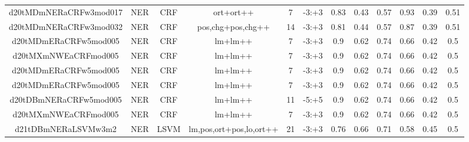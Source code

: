 \documentclass[a4paper]{article}
\begin{document}
\begin{landscape}
\begin{center}
\begin{tabular}{ |c|c|c|c|c|c|c|c|c|c|c|c|}
 	
 
 	
 		
 		\small{ d20tMDmNERaCRFw3mod017 } & NER & CRF & ort+ort++  &  7 &  -3:+3  &  0.83 & 0.43 & 0.57  &  0.93 & 0.39 & 0.51 \\
 		

 	
 
 	
 		
 		\small{ d20tMDmNERaCRFw3mod032 } & NER & CRF & pos,chg+pos,chg++  &  14 &  -3:+3  &  0.81 & 0.44 & 0.57  &  0.87 & 0.39 & 0.51 \\
 		

 	
 
 	
 		
 		\small{ d20tMDmERaCRFw5mod005 } & NER & CRF & lm+lm++  &  7 &  -3:+3  &  0.9 & 0.62 & 0.74  &  0.66 & 0.42 & 0.5 \\
 		

 	
 
 	
 		
 		\small{ d20tMXmNWEaCRFmod005 } & NER & CRF & lm+lm++  &  7 &  -3:+3  &  0.9 & 0.62 & 0.74  &  0.66 & 0.42 & 0.5 \\
 		

 	
 
 	
 		
 		\small{ d20tMDmERaCRFw5mod005 } & NER & CRF & lm+lm++  &  7 &  -3:+3  &  0.9 & 0.62 & 0.74  &  0.66 & 0.42 & 0.5 \\
 		

 	
 
 	
 		
 		\small{ d20tMDmERaCRFw5mod005 } & NER & CRF & lm+lm++  &  7 &  -3:+3  &  0.9 & 0.62 & 0.74  &  0.66 & 0.42 & 0.5 \\
 		

 	
 
 	
 		
 		\small{ d20tDBmNERaCRFw5mod005 } & NER & CRF & lm+lm++  &  11 &  -5:+5  &  0.9 & 0.62 & 0.74  &  0.66 & 0.42 & 0.5 \\
 		

 	
 
 	
 		
 		\small{ d20tMXmNWEaCRFmod005 } & NER & CRF & lm+lm++  &  7 &  -3:+3  &  0.9 & 0.62 & 0.74  &  0.66 & 0.42 & 0.5 \\
 		

 	
 
 	
 		
 		\small{ d21tDBmNERaLSVMw3m2 } & NER & LSVM & lm,pos,ort+pos,lo,ort++  &  21 &  -3:+3  &  0.76 & 0.66 & 0.71  &  0.58 & 0.45 & 0.5 \\
 		


\end{tabular}
\end{center}
\end{landscape}
\end{document}

